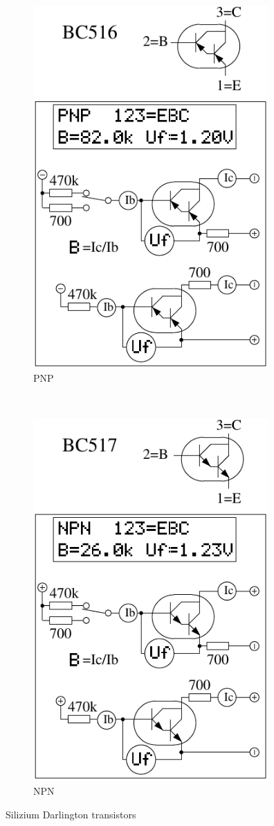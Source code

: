 \begin{figure}[H]
  \begin{subfigure}[b]{9cm}
    \centering
    \includegraphics[width=9cm]{../FIG/BJT_BC516.pdf}
    \caption{PNP}
    \label{fig:BJT-PNP-Darl}
  \end{subfigure}
  ~
  \begin{subfigure}[b]{9cm}
    \centering
    \includegraphics[width=9cm]{../FIG/BJT_BC517.pdf}
    \caption{NPN}
    \label{fig:BJT-NPN-Darl}
  \end{subfigure}
  \caption{Silizium Darlington transistors}
\end{figure}

